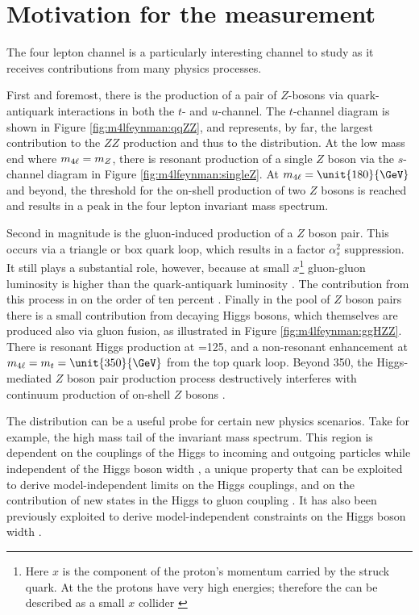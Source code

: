 \section{Motivation for the \mFourL{} measurement}
\label{sec:fourlepmotivation}

The four lepton channel is a particularly interesting channel to study as it receives contributions from many physics processes.  

First and foremost, there is the production of a pair of $Z$-bosons via quark-antiquark interactions in  both the $t$- and $u$-channel. The $t$-channel diagram is shown in Figure \ref{fig:m4lfeynman:qqZZ}, and represents, by far,  the largest contribution to the $ZZ$ production and thus to the \mFourL{} distribution. At the low mass end where $m_{4\ell}{}=m_{Z}$, there is resonant production of a single $Z$ boson via the $s$-channel diagram in Figure \ref{fig:m4lfeynman:singleZ}. At $\mFourL{}=\unit{180}{\GeV}$ and beyond, the threshold for the on-shell production of two $Z$ bosons is reached and results in a peak in the four lepton invariant mass spectrum. 

Second in magnitude is the gluon-induced production of a $Z$ boson pair. This occurs via a triangle or box quark loop, which results in a factor $\alpha_s^2$ suppression. It still plays a substantial role, however, because at small $x$\footnote{Here $x$ is the component of the proton's momentum carried by the struck quark. At the \LHC the protons have very high energies; therefore the \LHC can be described as a small $x$ collider \cite{zotov2012small}} gluon-gluon luminosity is higher than the quark-antiquark luminosity \cite{Glover:194539}. The contribution from this process in on the order of ten percent \cite{Becker:2230817}. Finally in the pool of $Z$ boson pairs there is a small contribution from decaying Higgs bosons, which themselves are produced also via gluon fusion, as illustrated in Figure \ref{fig:m4lfeynman:ggHZZ}. There is resonant Higgs production at \mFourL=\unit{125}{\GeV}, and a non-resonant enhancement at $\mFourL{}=m_{t}=\unit{350}{\GeV}$ from the top quark loop. Beyond \unit{350}{\GeV}, the Higgs-mediated $Z$ boson pair production process destructively interferes with continuum production of on-shell $Z$ bosons \cite{Campbell_2016}.

The \mFourL{} distribution can be a useful probe for certain new physics scenarios. Take for example, the high mass tail of the invariant mass spectrum. This region is dependent on the couplings of the Higgs to incoming and outgoing particles while independent of the Higgs boson width \cite{Campbell_2016}, a unique property that can be exploited to derive model-independent limits on the Higgs couplings, and on the  contribution of new states in the Higgs to gluon coupling \cite{Cacciapaglia_2014}. It has also been previously exploited to derive model-independent constraints on the Higgs boson width \cite{Caola_2013}. 

